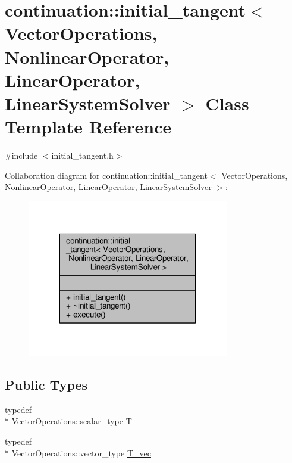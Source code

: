 \hypertarget{classcontinuation_1_1initial__tangent}{\section{continuation\-:\-:initial\-\_\-tangent$<$ Vector\-Operations, Nonlinear\-Operator, Linear\-Operator, Linear\-System\-Solver $>$ Class Template Reference}
\label{classcontinuation_1_1initial__tangent}
}


{\ttfamily \#include $<$initial\-\_\-tangent.\-h$>$}



Collaboration diagram for continuation\-:\-:initial\-\_\-tangent$<$ Vector\-Operations, Nonlinear\-Operator, Linear\-Operator, Linear\-System\-Solver $>$\-:\nopagebreak
\begin{figure}[H]
\begin{center}
\leavevmode
\includegraphics[width=250pt]{classcontinuation_1_1initial__tangent__coll__graph}
\end{center}
\end{figure}
\subsection*{Public Types}
\begin{DoxyCompactItemize}
\item 
typedef \\*
Vector\-Operations\-::scalar\-\_\-type \hyperlink{classcontinuation_1_1initial__tangent_a39f8fc77c4f6d3de481cd8550bb3e768}{T}
\item 
typedef \\*
Vector\-Operations\-::vector\-\_\-type \hyperlink{classcontinuation_1_1initial__tangent_ad348e9e404ffd58ae936cfae5cddc928}{T\-\_\-vec}
\end{DoxyCompactItemize}
